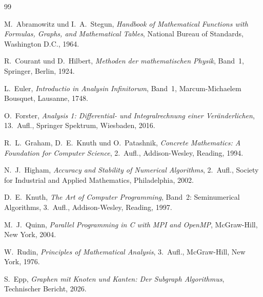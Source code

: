 ﻿\documentclass[a4paper,12pt]{article}
\theoremstyle{definition}
\begin{document}
\begin{thebibliography}{99}

M.~Abramowitz und I.~A.~Stegun,
\textit{Handbook of Mathematical Functions with Formulas, Graphs, and Mathematical Tables},
National Bureau of Standards, Washington D.C., 1964.

R.~Courant und D.~Hilbert,
\textit{Methoden der mathematischen Physik}, Band~1,
Springer, Berlin, 1924.

L.~Euler,
\textit{Introductio in Analysin Infinitorum}, Band~1,
Marcum-Michaelem Bousquet, Lausanne, 1748.

O.~Forster,
\textit{Analysis 1: Differential- und Integralrechnung einer Veränderlichen},
13.~Aufl., Springer Spektrum, Wiesbaden, 2016.

R.~L.~Graham, D.~E.~Knuth und O.~Patashnik,
\textit{Concrete Mathematics: A Foundation for Computer Science},
2.~Aufl., Addison-Wesley, Reading, 1994.

N.~J.~Higham,
\textit{Accuracy and Stability of Numerical Algorithms},
2.~Aufl., Society for Industrial and Applied Mathematics, Philadelphia, 2002.

D.~E.~Knuth,
\textit{The Art of Computer Programming}, Band~2: Seminumerical Algorithms,
3.~Aufl., Addison-Wesley, Reading, 1997.

M.~J.~Quinn,
\textit{Parallel Programming in C with MPI and OpenMP},
McGraw-Hill, New York, 2004.

W.~Rudin,
\textit{Principles of Mathematical Analysis},
3.~Aufl., McGraw-Hill, New York, 1976.

S.~Epp,
\textit{Graphen mit Knoten und Kanten: Der Subgraph Algorithmus}, Technischer Bericht, 2026.

\end{thebibliography}
\end{document}
